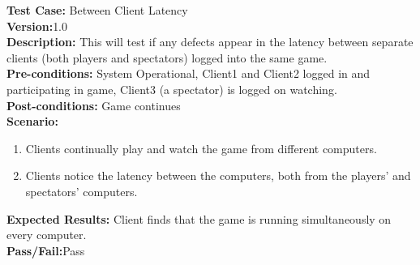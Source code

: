 \noindent \textbf{Test Case:} Between Client Latency\\
\textbf{Version:}1.0\\
\textbf{Description:} This will test if any defects appear in the latency between separate clients (both players and spectators) logged into the same game.\\
\textbf{Pre-conditions:} System Operational, Client1 and Client2 logged in and participating in game, Client3 (a spectator) is logged on watching. \\
\textbf{Post-conditions:} Game continues\\
\textbf{Scenario:}
\begin{enumerate}
\item Clients continually play and watch the game from different computers.\\
\item Clients notice the latency between the computers, both from the players' and spectators' computers.\\
\end{enumerate}
\textbf{Expected Results:} Client finds that the game is running simultaneously on every computer.\\
\textbf{Pass/Fail:}Pass\\













